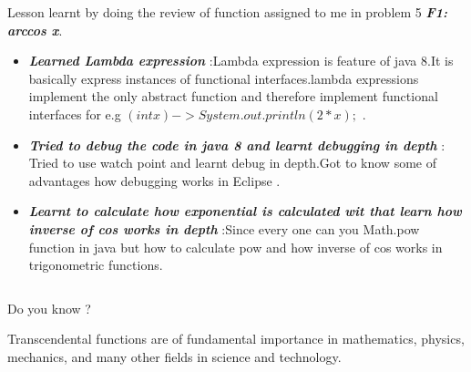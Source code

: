 \documentclass[final]{beamer}
\newlength{\onecolwid}
\newlength{\twocolwid}
\begin{document}
\begin{frame}[t]
\begin{columns}[t]
\begin{column}{\twocolwid}
\begin{columns}[t,totalwidth=\twocolwid]
\begin{column}{\onecolwid}
\begin{block}{Lesson learnt by doing the review of function assigned to me in problem 5  \textbf{\textit{ F1: arccos x}}.}
\begin{itemize}
\item  \textit{\textbf{Learned Lambda expression}} :Lambda expression is feature of java 8.It is basically express instances of functional interfaces.lambda expressions implement the only abstract function and therefore implement functional interfaces for e.g $(int x)->System.out.println(2*x); $ .\newline
\item  \textit{\textbf{Tried to debug the code in java 8 and learnt debugging in depth}} : Tried to use watch point and learnt debug in depth.Got to know some of advantages how debugging works in Eclipse .\newline
\item \textit{\textbf{Learnt to calculate how exponential is calculated wit that learn how inverse of cos works in depth}} :Since every one can you Math.pow function in java but how to calculate pow and how inverse of cos works in trigonometric functions.
\end{itemize}


\end{block}


\end{column} %

\end{columns} %


\begin{alertblock}{Do you know ?}

Transcendental functions are of fundamental importance in mathematics, physics, mechanics, and many other fields in science and technology.

\end{alertblock} 


\begin{columns}[t,totalwidth=\twocolwid] %


\end{columns}
\end{column}
\end{columns}
\end{frame}
\end{document}
